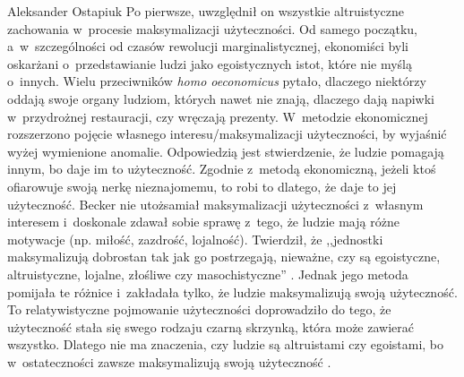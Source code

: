 \begin{artplenv}{Aleksander Ostapiuk}
Po pierwsze, uwzględnił on wszystkie altruistyczne zachowania w~procesie maksymalizacji użyteczności. Od samego początku,
a~w~szczególności od czasów rewolucji marginalistycznej, ekonomiści byli oskarżani o~przedstawianie ludzi jako
egoistycznych istot, które nie myślą o~innych. Wielu przeciwników \textit{homo oeconomicus} pytało, dlaczego niektórzy
oddają swoje organy ludziom, których nawet nie znają, dlaczego dają napiwki w~przydrożnej restauracji, czy wręczają
prezenty. W~metodzie ekonomicznej rozszerzono pojęcie własnego interesu/maksymalizacji użyteczności, by wyjaśnić wyżej
wymienione anomalie. Odpowiedzią jest stwierdzenie, że ludzie pomagają innym, bo daje im to użyteczność.
Zgodnie z~metodą ekonomiczną, jeżeli ktoś ofiarowuje swoją nerkę nieznajomemu, to robi to dlatego, że daje to jej
użyteczność. Becker nie utożsamiał maksymalizacji użyteczności z~własnym interesem i~doskonale zdawał sobie
sprawę z~tego, że ludzie mają różne motywacje (np. miłość, zazdrość, lojalność). Twierdził, że ,,jednostki maksymalizują
dobrostan tak jak go postrzegają, nieważne, czy są egoistyczne, altruistyczne, lojalne, złośliwe czy masochistyczne''
\parencite[s.~386]{becker_economic_1993}.
Jednak jego metoda pomijała te różnice i~zakładała
tylko, że ludzie maksymalizują swoją użyteczność. To relatywistyczne pojmowanie użyteczności doprowadziło do tego, że
użyteczność stała się swego rodzaju czarną skrzynką, która może zawierać wszystko. Dlatego nie ma znaczenia, czy ludzie
są altruistami czy egoistami, bo w~ostateczności zawsze maksymalizują swoją użyteczność
\parencite{sen_rational_1977}.


\end{artplenv}
